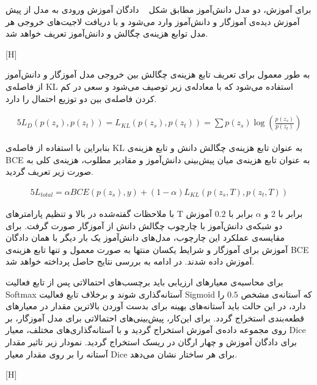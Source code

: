 برای آموزش، دو مدل دانش‌آموز مطابق شکل ~ دادگان آموزش ورودی به مدل از پیش آموزش دیده‌ی آموزگار و دانش‌آموز وارد می‌شود و با دریافت لاجیت‌های خروجی هر مدل توابع هزینه‌ی چگالش و دانش‌آموز تعریف خواهد شد.

[H]

به طور معمول برای تعریف تابع هزینه‌ی چگالش بین خروجی مدل آموزگار و دانش‌آموز از فاصله‌ی
 KL 
 استفاده می‌شود  که با معادله‌ی زیر توصیف می‌شود و سعی در کم کردن فاصله‌ی بین دو توزیع احتمال را دارد. 

\begin{alignat}{5}
	L_D(p(z_s), p(z_t)) = L_{KL}(p(z_s), p(z_t)) = \sum p(z_s) \log(\frac{p(z_s)}{p(z_t)})    \label{kldivergence} 
\end{alignat}

بنابراین با استفاده از فاصله‌ی KL به عنوان تابع هزینه‌ی چگالش دانش و تابع هزینه‌ی BCE به عنوان تابع هزینه‌ی میان پیش‌بینی دانش‌آموز و مقادیر مطلوب، هزینه‌ی کلی به صورت زیر تعریف گردید.
 
\begin{alignat}{5}
	L_{total} = \alpha BCE(p(z_s), y) + (1-\alpha)L_{KL}(p(z_s,T), p(z_t,T))     \label{bceklloss} 
\end{alignat}

با ملاحظات گفته‌شده در بالا و تنظیم پارامترهای T برابر با 2 و $\alpha$ برابر با $0.2$ آموزش دو شبکه‌ی دانش‌آموز با چارچوب چگالش دانش از آموزگار صورت گرفت. برای مقایسه‌ی عملکرد این چارچوب، مدل‌های دانش‌آموز یک‌ بار دیگر با همان دادگان آموزش برای آموزگار و شرایط یکسان منتها به صورت معمول و تنها تابع هزینه‌ی BCE آموزش داده شدند. در ادامه به بررسی نتایج حاصل پرداخته خواهد شد.


برای محاسبه‌ی معیارهای ارزیابی باید برچسب‌های احتمالاتی پس از تابع فعالیت Softmax آستانه‌گذاری شوند و برخلاف تابع فعالیت Sigmoid که آستانه‌ی مشخص $0.5$ را دارد، در این حالت باید آستانه‌های بهینه برای بدست آوردن بالاترین مقدار در معیارهای قطعه‌بندی استخراج گردد. برای این‌کار، پیش‌بینی‌های احتمالاتی برای مدل آموزگار، بر روی مجموعه‌ داده‌ی آموزش استخراج گردید و با آستانه‌گذاری‌های مختلف، معیار Dice برای دادگان آموزش و چهار ارگان در ریسک استخراج گردید. نمودار زیر تاثیر مقدار آستانه را بر روی مقدار معیار Dice برای هر ساختار نشان می‌دهد.

[H]

